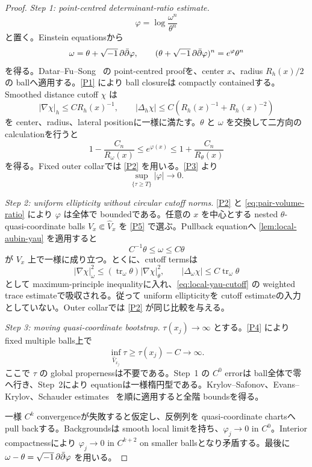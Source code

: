 \documentclass[11pt,a4paper]{ltjsarticle}
\newcommand{\tr}{\operatorname{tr}}\newcommand{\id}{\operatorname{id}}
\theoremstyle{plain}
\theoremstyle{definition}
\theoremstyle{remark}
\begin{document}
\begin{proof}
\emph{Step 1: point-centred determinant-ratio estimate.}
\[
 \varphi=\log\frac{\omega^n}{\theta^n}
\]
と置く。Einstein equationsから
\[
 \omega=\theta+\sqrt{-1}\,\partial\bar\partial\varphi,
 \qquad
 (\theta+\sqrt{-1}\,\partial\bar\partial\varphi)^n=e^\varphi\theta^n
\]
を得る。Datar--Fu--Song~\cite[Theorem~1.3 and Remark~3.1]{DFS} の point-centred proofを、center $x$、radius $R_h(x)/2$ の ballへ適用する。\ref{P1} により ball closureは compactly containedする。Smoothed distance cutoff $\chi$ は
\[
 |\nabla\chi|_h\le C R_h(x)^{-1},
 \qquad
 |\Delta_h\chi|\le C(R_h(x)^{-1}+R_h(x)^{-2})
\]
を center、radius、lateral positionに一様に満たす。$\theta$ と $\omega$ を交換して二方向の calculationを行うと
\begin{equation}\label{eq:pair-volume-ratio}
 1-\frac{C_n}{R_\omega(x)}
 \le e^{\varphi(x)}
 \le1+\frac{C_n}{R_\theta(x)}
\end{equation}
を得る。Fixed outer collarでは \ref{P2} を用いる。\ref{P3} より
\[
 \sup_{\{\tau\ge T\}}|\varphi|\longrightarrow0.
\]

\emph{Step 2: uniform ellipticity without circular cutoff norms.}
\ref{P2} と \eqref{eq:pair-volume-ratio} により $\varphi$ は全体で boundedである。任意の $x$ を中心とする nested $\theta$-quasi-coordinate balls $V_x\Subset\widehat V_x$ を \ref{P5} で選ぶ。Pullback equationへ \cref{lem:local-aubin-yau} を適用すると
\[
 C^{-1}\theta\le\omega\le C\theta
\]
が $V_x$ 上で一様に成り立つ。とくに、cutoff termsは
\[
 |\nabla\chi|_\omega^2
 \le(\tr_\omega\theta)|\nabla\chi|_\theta^2,
 \qquad
 |\Delta_\omega\chi|\le C\tr_\omega\theta
\]
として maximum-principle inequalityに入れ、\eqref{eq:local-yau-cutoff} の weighted trace estimateで吸収される。従って uniform ellipticityを cutoff estimateの入力としていない。Outer collarでは \ref{P2} が同じ比較を与える。

\emph{Step 3: moving quasi-coordinate bootstrap.}
$\tau(x_j)\to\infty$ とする。\ref{P4} により fixed multiple balls上で
\[
 \inf_{\widehat V_{x_j}}\tau
 \ge \tau(x_j)-C\longrightarrow\infty.
\]
ここで $\tau$ の global propernessは不要である。Step~1 の $C^0$ errorは ball全体で零へ行き、Step~2により equationは一様楕円型である。Krylov--Safonov、Evans--Krylov、Schauder estimates~\cite{CC,DZZ} を順に適用すると全階 boundsを得る。

一様 $C^k$ convergenceが失敗すると仮定し、反例列を quasi-coordinate chartsへ pull backする。Backgroundsは smooth local limitを持ち、$\varphi_j\to0$ in $C^0$。Interior compactnessにより $\varphi_j\to0$ in $C^{k+2}$ on smaller ballsとなり矛盾する。最後に $\omega-\theta=\sqrt{-1}\,\partial\bar\partial\varphi$ を用いる。
\end{proof}
\end{document}
